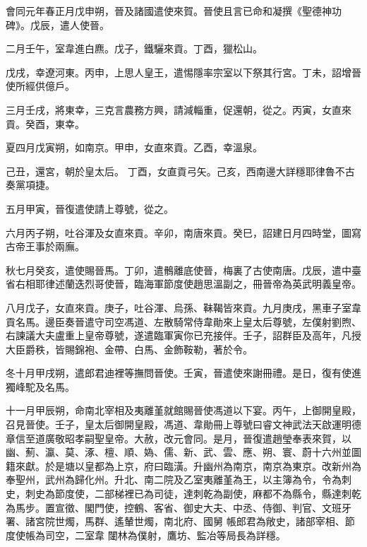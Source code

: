 
\begin{pinyinscope}

 會同元年春正月戊申朔，晉及諸國遣使來賀。晉使且言已命和凝撰《聖德神功碑》。戊辰，遣人使晉。



 二月壬午，室韋進白麃。戊子，鐵驪來貢。丁酉，獵松山。



 戊戌，幸遼河東。丙申，上思人皇王，遣惕隱率宗室以下祭其行宮。丁未，詔增晉使所經供億戶。



 三月壬戌，將東幸，三克言農務方興，請減輜重，促還朝，從之。丙寅，女直來貢。癸酉，東幸。



 夏四月戊寅朔，如南京。甲申，女直來貢。乙酉，幸溫泉。



 己丑，還宮，朝於皇太后。
 丁酉，女直貢弓矢。己亥，西南邊大詳穩耶律魯不古奏黨項捷。



 五月甲寅，晉復遣使請上尊號，從之。



 六月丙子朔，吐谷渾及女直來貢。辛卯，南唐來貢。癸巳，詔建日月四時堂，圖寫古帝王事於兩廡。



 秋七月癸亥，遣使賜晉馬。丁卯，遣鶻離底使晉，梅裏了古使南唐。戊辰，遣中臺省右相耶律述蘭迭烈哥使晉，臨海軍節度使趙思溫副之，冊晉帝為英武明義皇帝。



 八月戊子，女直來貢。庚子，吐谷渾、烏孫、靺鞨皆來貢。九月庚戌，黑車子室韋貢名馬。邊臣奏晉遣守司空馮道、左散騎常侍韋勛來上皇太后尊號，左僕射劉煦、右諫議大夫盧重上皇帝尊號，遂遣臨軍寅你已充接伴。壬子，詔群臣及高年，凡授大臣爵秩，皆賜錦袍、金帶、白馬、金飾鞍勒，著於令。



 冬十月甲戌朔，遣郎君迪裡等撫問晉使。壬寅，晉遣使來謝冊禮。是日，復有使進獨峰駝及名馬。



 十一月甲辰朔，命南北宰相及夷離堇就館賜晉使馮道以下宴。丙午，上御開皇殿，召見晉使。壬子，皇太后御開皇殿，馮道、韋勛冊上尊號曰睿文神武法天啟運明德章信至道廣敬昭孝嗣聖皇帝。大赦，改元會同。是月，晉復遣趙瑩奉表來賀，以幽、薊、瀛、莫、涿、檀、順、媯、儒、新、武、雲、應、朔、寰、蔚十六州並圖籍來獻。於是塘以皇都為上京，府曰臨潢。升幽州為南京，南京為東京。改新州為奉聖州，武州為歸化州。升北、南二院及乙室夷離堇為王，以主簿為令，令為刺史，刺史為節度使，二部梯裡已為司徒，達刺乾為副使，麻都不為縣令，縣達刺乾為馬步。置宣徵、閣門使，控鶴、客省、御史大夫、中丞、侍御、判官、文班牙署、諸宮院世燭，馬群、遙輦世燭，南北府、國舅
 帳郎君為敞史，諸部宰相、節度使帳為司空，二室韋
 闥林為僕射，鷹坊、監冶等局長為詳穩。




\end{pinyinscope}
